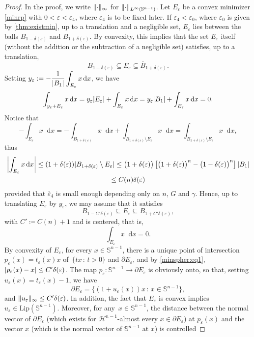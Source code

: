 \documentclass[JEP,XML,SOM,Unicode,published]{cedram}
\newcommand{\sep}{\,:\,}
\numberwithin{equation}{section}
\theoremstyle{plain}
\theoremstyle{definition}
\newcommand{\dx}{\mathop{}\mathopen{}\mathrm{d}x}
\newcommand{\bbS}{\mathbb{S}}
\newcommand{\calH}{{\mathscr{H}}}
\let\eps\varepsilon
\let\ol\overline
\newcommand{\Lip}{{\mathrm{Lip}}}
\newcommand{\subsq}{\subseteq}
\DeclarePairedDelimiter{\abs}{\lvert}{\rvert}
\DeclarePairedDelimiter{\norm}{\lVert}{\rVert}
\begin{document}
\begin{proof}
In the proof, we write $\norm{\cdot}_\infty$ for $\norm{\cdot}_{L^\infty(\bbS^{n-1})}$.
Let $E_\eps$ be a convex minimizer \cref{minrp} with $0<\eps<\ol{\eps}_4$, where $\ol{\eps}_4$ is to
be fixed later. If $\ol{\eps}_4<\eps_0$, where $\eps_0$ is given by \cref{thm:existmin}, up to a
translation and a negligible set, $E_\eps$ lies between the balls $B_{1-\delta(\eps)}$ and
$B_{1+\delta(\eps)}$. By convexity, this implies that the set $E_\eps$ itself (without the addition
or the subtraction of a negligible set) satisfies, up to a translation,
\[
B_{1-\delta(\eps)}\subsq E_\eps \subsq \ol{B}_{1+\delta(\eps)}.
\]
Setting $\displaystyle y_\eps:=-\frac{1}{\abs{B_1}}\int_{E_\eps}x\dx$, we have
\[
\int_{y_\eps+E_\eps} x\dx
=y_\eps\abs{E_\eps}+\int_{E_\eps} x\dx=y_\eps\abs{B_1}+\int_{E_\eps}x\dx=0.
\]
Notice that
\[
-\int_{E_\eps} x\dx=-\int_{B_{1+\delta(\eps)}}x\dx+\int_{B_{1+\delta(\eps)}\setminus E_\eps} x\dx
=\int_{B_{1+\delta(\eps)}\setminus E_\eps} x\dx,
\]
thus
\begin{multline*}
\abs*{\int_{E_\eps} x\dx}\leq (1+\delta(\eps))\abs{B_{1+\delta(\eps)}\setminus E_\eps}
\leq \big(1+\delta(\eps)\big)\left[\big(1+\delta(\eps)\big)^n-\big(1-\delta(\eps)\big)^n\right]
\abs{B_1}\\
\leq C(n)\delta(\eps)
\end{multline*}
provided that $\ol{\eps}_4$ is small enough depending only on $n$, $G$ and $\gamma$. Hence, up to
translating $E_\eps$ by $y_\eps$, we may assume that it satisfies
\begin{equation}\label{minspher:eq1}
B_{1-C'\delta(\eps)}\subsq E_\eps \subsq B_{1+C'\delta(\eps)},
\end{equation}
with $C'\coloneqq C(n)+1$ and is centered, that is,
\[
\int_{E_\eps} x\dx=0.
\]
By convexity of $E_\eps$, for every $x\in\bbS^{n-1}$, there is a unique point of intersection
$p_\eps(x)=t_\eps(x) x$ of~${\{tx\sep t>0\}}$ and $\partial E_\eps$, and by \cref{minspher:eq1},
$\abs{p_\eps(x)-x}\leq C'\delta(\eps)$. The map $p_\eps: \bbS^{n-1}\to\partial E_\eps$ is obviously
onto, so that, setting $u_\eps(x)=t_\eps(x)-1$, we have
\[
\partial E_\eps=\bigl\{ (1+u_\eps(x))x \sep  x\in\bbS^{n-1} \bigl\},
\]
and $\norm{u_\eps}_\infty\leq C'\delta(\eps)$. In addition, the fact that $E_\eps$ is convex implies
$u_\eps\in \Lip(\bbS^{n-1})$. Moreover, for any~$x\in\bbS^{n-1}$, the distance between the normal
vector of $\partial E_\eps$ (which exists for $\calH^{n-1}$-almost every $x\in\partial E_\eps$) at
$p_\eps(x)$ and the vector $x$ (which is the normal vector of $\bbS^{n-1}$ at $x$) is controlled

\end{proof}
\end{document}
